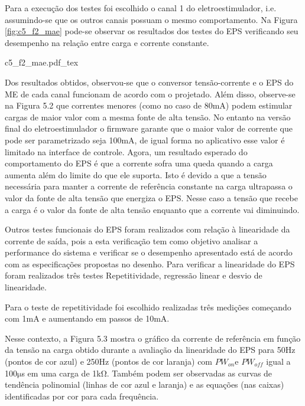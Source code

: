 Para a execução dos testes foi escolhido o canal 1 do eletroestimulador, i.e. assumindo-se que os outros canais possuam o mesmo comportamento. Na Figura \ref{fig:c5_f2_mae} pode-se observar os resultados dos testes do EPS verificando seu desempenho na relação entre carga e corrente constante.

\vspace{0.3cm}

\begin{figure*}[h]
    \centering %
    \small %
    \def\svgwidth{0.7\columnwidth}%
    {c5_f2_mae.pdf_tex}
    \caption{Resultados dos testes do EPS.}
    \label{fig:c5_f2_mae}
\end{figure*}

Dos resultados obtidos, observou-se que o conversor tensão-corrente e o \acrshort{EPS} do \acrshort{ME} de cada canal funcionam de acordo com o projetado. Além disso, observe-se na Figura 5.2 que correntes menores (como no caso de 80mA) podem estimular cargas de maior valor com a mesma fonte de alta tensão. No entanto na versão final do eletroestimulador o firmware garante que o maior valor de corrente que pode ser parametrizado seja 100mA, de igual forma no aplicativo esse valor é limitado na interface de controle. Agora, um resultado esperado do comportamento do EPS é que a corrente sofra uma queda quando a carga aumenta além do limite do que ele suporta. Isto é devido a que a tensão necessária para manter a corrente de referência constante na carga ultrapassa o valor da fonte de alta tensão que energiza o \acrshort{EPS}. Nesse caso a tensão que recebe a carga é o valor da fonte de alta tensão enquanto que a corrente vai diminuindo.

Outros testes funcionais do \acrshort{EPS} foram realizados com relação à linearidade da corrente de saída, pois a esta verificação tem como objetivo analisar a performance do sistema e verificar se o desempenho apresentado está de acordo com as especificações propostas no desenho. 
Para verificar a linearidade do EPS foram realizados três testes Repetitividade, regressão linear e desvio de linearidade.

Para o teste de repetitividade foi escolhido realizadas três medições começando com 1mA e aumentando em passos de 10mA. 


Nesse contexto, a Figura 5.3 mostra o gráfico da corrente de referência em função da tensão na carga obtido durante a avaliação da linearidade do \acrshort{EPS} para 50Hz (pontos de cor azul) e 250Hz (pontos de cor laranja) com $PW_{on}$e $PW_{off}$ igual a 100$\mathrm{\mu}$s em uma carga de 1k$\mathrm{\Omega}$. Também podem ser observadas as curvas de tendência polinomial (linhas de cor azul e laranja) e as equações (nas caixas) identificadas por cor para cada frequência.



